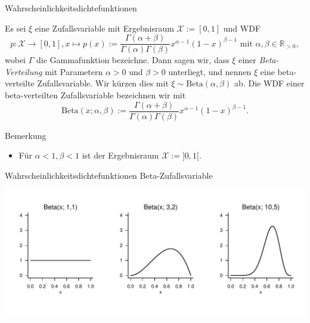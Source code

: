 \documentclass[
  8pt,
  ignorenonframetext,
]{beamer}
\begin{document}
\begin{frame}{Wahrscheinlichkeitsdichtefunktionen}
\protect\hypertarget{wahrscheinlichkeitsdichtefunktionen-5}{}
\small
\begin{definition}
\justifying
Es sei $\xi$ eine Zufallsvariable mit Ergebnisraum $\mathcal{X} := [0,1]$ und WDF
\begin{equation}
p : \mathcal{X} \to [0,1], x \mapsto p(x)
:= \frac{\Gamma(\alpha + \beta)}{\Gamma(\alpha)\Gamma(\beta)}
x^{\alpha-1}(1-x)^{\beta-1} \mbox{ mit } \alpha,\beta \in \mathbb{R}_{>0},
\end{equation}
wobei $\Gamma$ die Gammafunktion bezeichne. Dann sagen wir, dass $\xi$ einer
\textit{Beta-Verteilung} mit Parametern $\alpha >0$ und $\beta>0$ unterliegt,
und nennen $\xi$ eine beta-verteilte Zufallsvariable. Wir kürzen dies mit
$\xi \sim \mbox{Beta}(\alpha,\beta)$ ab. Die WDF einer beta-verteilten Zufallsvariable
bezeichnen wir mit
\begin{equation}
\mbox{Beta}(x;\alpha,\beta)
:= \frac{\Gamma(\alpha + \beta)}{\Gamma(\alpha)\Gamma(\beta)}
x^{\alpha-1}(1-x)^{\beta-1}.
\end{equation}
\end{definition}

Bemerkung

\begin{itemize}
\item Für $\alpha < 1, \beta < 1$ ist der Ergebnisraum $\mathcal{X} := ]0,1[$.
\end{itemize}
\end{frame}

\begin{frame}{Wahrscheinlichkeitsdichtefunktionen}
\protect\hypertarget{wahrscheinlichkeitsdichtefunktionen-6}{}
Beta-Zufallsvariable \vspace{1cm}

\begin{center}\includegraphics[width=1\linewidth]{4_Abbildungen/wtfi_4_betaverteilung_wdf} \end{center}
\end{frame}
\end{document}

